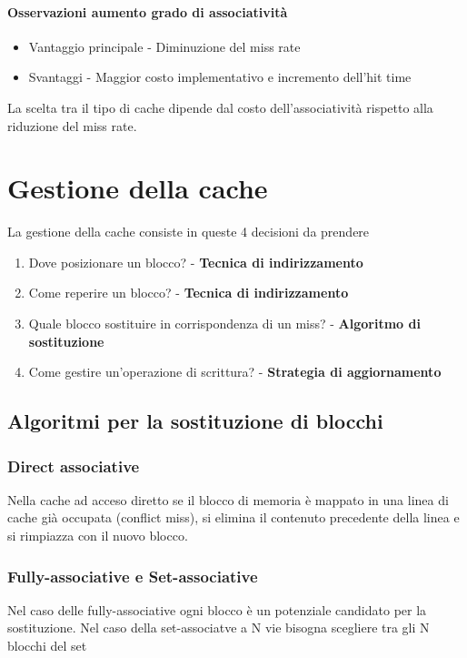 \documentclass[12pt, a4paper, openany]{book}
\begin{document}
\paragraph{Osservazioni aumento grado di associatività}
\begin{itemize}
    \item Vantaggio principale - Diminuzione del miss rate
    \item Svantaggi - Maggior costo implementativo e incremento dell'hit time
\end{itemize}

La scelta tra il tipo di cache dipende dal costo dell'associatività rispetto alla riduzione
del miss rate.

\section{Gestione della cache}
La gestione della cache consiste in queste 4 decisioni da prendere
\begin{enumerate}
    \item Dove posizionare un blocco? - \textbf{Tecnica di indirizzamento}
    \item Come reperire un blocco? - \textbf{Tecnica di indirizzamento}
    \item Quale blocco sostituire in corrispondenza di un miss? - \textbf{Algoritmo di sostituzione}
    \item Come gestire un'operazione di scrittura? - \textbf{Strategia di aggiornamento}
\end{enumerate}

\subsection{Algoritmi per la sostituzione di blocchi}
\subsubsection*{Direct associative}
Nella cache ad acceso diretto se il blocco di memoria è mappato in una linea di cache già
occupata (conflict miss), si elimina il contenuto precedente della linea e si rimpiazza con
il nuovo blocco.

\subsubsection*{Fully-associative e Set-associative}
Nel caso delle fully-associative ogni blocco è un potenziale candidato per la sostituzione.
Nel caso della set-associatve a N vie bisogna scegliere tra gli N blocchi del set
\end{document}
